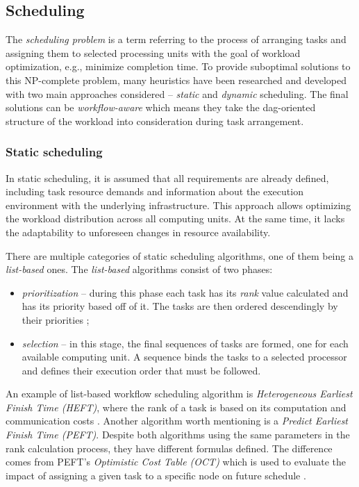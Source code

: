 \subsection{Scheduling}
\label{s:ProblemDomain:Scheduling}

The \emph{scheduling problem} is a term referring to the process of arranging tasks and assigning them to selected processing units with the goal of workload optimization, e.g., minimize completion time.
To provide suboptimal solutions to this NP-complete problem, many heuristics have been researched and developed with two main approaches considered -- \emph{static} and \emph{dynamic} scheduling.
The final solutions can be \emph{workflow-aware} which means they take the dag-oriented structure of the workload into consideration during task arrangement.


\subsubsection{Static scheduling}
\label{s:ProblemDomain:StaticSched}

In static scheduling, it is assumed that all requirements are already defined, including task resource demands and information about the execution environment with the underlying infrastructure.
This approach allows optimizing the workload distribution across all computing units.
At the same time, it lacks the adaptability to unforeseen changes in resource availability. 


There are multiple categories of static scheduling algorithms, one of them being a \emph{list-based} ones.
The \emph{list-based} algorithms consist of two phases:


\begin{itemize}
  \item{
\emph{prioritization} -- during this phase each task has its \emph{rank} value calculated and has its priority based off of it. The tasks are then ordered descendingly by their priorities
};
  \item{
\emph{selection} -- in this stage, the final sequences of tasks are formed, one for each available computing unit. A sequence binds the tasks to a selected processor and defines their execution order that must be followed.
}
\end{itemize}


An example of list-based workflow scheduling algorithm is \emph{Heterogeneous Earliest Finish Time (HEFT)}, where the rank of a task is based on its computation and communication costs \cite{b:HEFT}.
Another algorithm worth mentioning is a \emph{Predict Earliest Finish Time (PEFT)}.
Despite both algorithms using the same parameters in the rank calculation process, they have different formulas defined.
The difference comes from PEFT's \emph{Optimistic Cost Table (OCT)} which is used to evaluate the impact of assigning a given task to a specific node on future schedule \cite{b:PEFT}.



